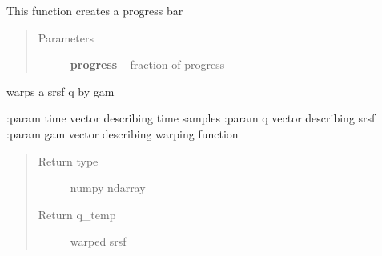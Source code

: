 \documentclass[letterpaper,10pt,english]{sphinxmanual}
\begin{document}

\begin{fulllineitems}
\label{utility_functions:utility_functions.update_progress}
This function creates a progress bar
\begin{quote}\begin{description}
\item[{Parameters}] \leavevmode
\textbf{progress} -- fraction of progress

\end{description}\end{quote}

\end{fulllineitems}


\begin{fulllineitems}
\label{utility_functions:utility_functions.warp_q_gamma}
warps a srsf q by gam

:param time vector describing time samples
:param q vector describing srsf
:param gam vector describing warping function
\begin{quote}\begin{description}
\item[{Return type}] \leavevmode
numpy ndarray

\item[{Return q\_temp}] \leavevmode
warped srsf

\end{description}\end{quote}

\end{fulllineitems}

\end{document}

